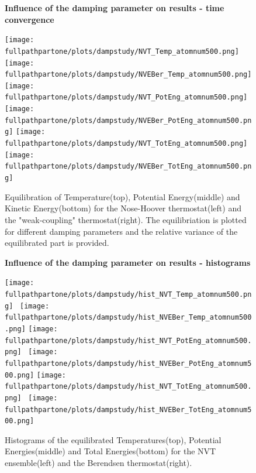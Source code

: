 \documentclass[10pt,a4paper]{report}
\def \fullpathpartone {/home/lukas/Desktop/project/independence/atomistic_modeling/exam/1_three-dimensional_atomic_system}
\newcommand*{\figuretitle}[1]{%
    {\centering%
    \textbf{#1}%
    \par\medskip}%
}
\begin{document}
\begin{center}
\begin{figure}[h]
\figuretitle{Influence of the damping parameter on results - time convergence}
\texttt{[image: \\fullpathpartone/plots/dampstudy/NVT\_Temp\_atomnum500.png]}~
\texttt{[image: \\fullpathpartone/plots/dampstudy/NVEBer\_Temp\_atomnum500.png]}
\texttt{[image: \\fullpathpartone/plots/dampstudy/NVT\_PotEng\_atomnum500.png]}~
\texttt{[image: \\fullpathpartone/plots/dampstudy/NVEBer\_PotEng\_atomnum500.png]}
\texttt{[image: \\fullpathpartone/plots/dampstudy/NVT\_TotEng\_atomnum500.png]}~
\texttt{[image: \\fullpathpartone/plots/dampstudy/NVEBer\_TotEng\_atomnum500.png]}
\caption[Influence of the damping parameter on results - time convergence]{Equilibration of Temperature(top), Potential Energy(middle) and Kinetic Energy(bottom) for the Nose-Hoover thermostat(left) and the "weak-coupling" thermostat(right). The equilibriation is plotted for different damping parameters and the relative variance of the equilibrated part is provided.}
\label{fig:p1_equilibriation}
\end{figure}
\end{center}


\begin{center}
\begin{figure}[h]
\figuretitle{Influence of the damping parameter on results - histograms}
\texttt{[image: \\fullpathpartone/plots/dampstudy/hist\_NVT\_Temp\_atomnum500.png]}~
\texttt{[image: \\fullpathpartone/plots/dampstudy/hist\_NVEBer\_Temp\_atomnum500.png]}
\texttt{[image: \\fullpathpartone/plots/dampstudy/hist\_NVT\_PotEng\_atomnum500.png]}~
\texttt{[image: \\fullpathpartone/plots/dampstudy/hist\_NVEBer\_PotEng\_atomnum500.png]}
\texttt{[image: \\fullpathpartone/plots/dampstudy/hist\_NVT\_TotEng\_atomnum500.png]}~
\texttt{[image: \\fullpathpartone/plots/dampstudy/hist\_NVEBer\_TotEng\_atomnum500.png]}
\caption[Influence of the damping parameter on results - histograms]{Histograms of the equilibrated Temperatures(top), Potential Energies(middle) and Total Energies(bottom) for the NVT ensemble(left) and the Berendsen thermostat(right).}
\label{fig:p1_equilibriation_histograms}
\end{figure}
\end{center}
\end{document}
